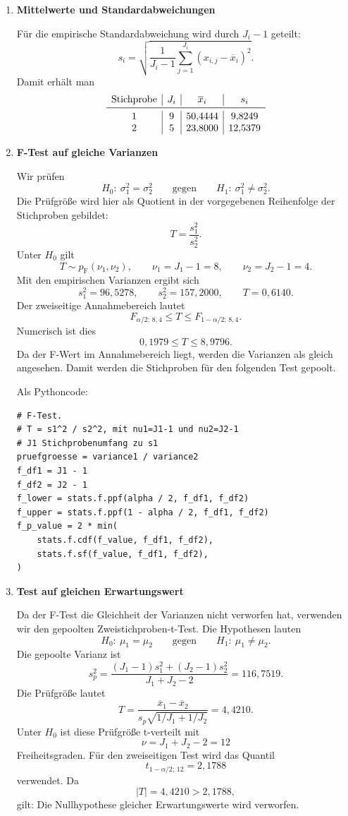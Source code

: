 \begin{enumerate}


\item[a)] \textbf{Mittelwerte und Standardabweichungen}

Für die empirische Standardabweichung wird durch $J_i-1$ geteilt:
\[
s_i=\sqrt{\frac{1}{J_i-1}\sum_{j=1}^{J_i}
(x_{i,j}-\overline{x}_i)^2}.
\]
Damit erhält man
\[
\begin{array}{c|c|c|c}
\text{Stichprobe} & J_i & \overline{x}_i & s_i\\
\midrule
1 & 9 & 50{,}4444 & 9{,}8249\\
2 & 5 & 23{,}8000 & 12{,}5379
\end{array}
\]

\item[b)] \textbf{F-Test auf gleiche Varianzen}

Wir prüfen
\[
H_0:\ \sigma_1^2=\sigma_2^2
\qquad\text{gegen}\qquad
H_1:\ \sigma_1^2\ne\sigma_2^2.
\]
Die Prüfgröße wird hier als Quotient in der vorgegebenen Reihenfolge
der Stichproben gebildet:
\[
T=\frac{s_1^2}{s_2^2}.
\]
Unter $H_0$ gilt
\[
T\sim p_\mathrm{F}({\nu_1,\nu_2}),
\qquad
\nu_1=J_1-1=8,
\qquad
\nu_2=J_2-1=4.
\]
Mit den empirischen Varianzen ergibt sich
\[
s_1^2=96{,}5278,
\qquad
s_2^2=157{,}2000,
\qquad
T=0{,}6140.
\]
Der zweiseitige Annahmebereich lautet
\[
F_{\alpha/2;\,8,4}
\leq T \leq
F_{1-\alpha/2;\,8,4}.
\]
Numerisch ist dies
\[
0{,}1979\leq T\leq8{,}9796.
\]
Da der F-Wert im Annahmebereich liegt, werden die Varianzen als gleich angesehen.
Damit werden die Stichproben für den folgenden Test gepoolt.

Als Pythoncode:

\begin{lstlisting}[style=Python]
# F-Test. 
# T = s1^2 / s2^2, mit nu1=J1-1 und nu2=J2-1
# J1 Stichprobenumfang zu s1
pruefgroesse = variance1 / variance2
f_df1 = J1 - 1
f_df2 = J2 - 1
f_lower = stats.f.ppf(alpha / 2, f_df1, f_df2)
f_upper = stats.f.ppf(1 - alpha / 2, f_df1, f_df2)
f_p_value = 2 * min(
    stats.f.cdf(f_value, f_df1, f_df2),
    stats.f.sf(f_value, f_df1, f_df2),
)
\end{lstlisting}

\item[c)] \textbf{Test auf gleichen Erwartungswert}

Da der F-Test die Gleichheit der Varianzen nicht verworfen hat,
verwenden wir den gepoolten Zweistichproben-t-Test. Die Hypothesen lauten
\[
H_0:\ \mu_1=\mu_2
\qquad\text{gegen}\qquad
H_1:\ \mu_1\ne\mu_2.
\]
Die gepoolte Varianz ist
\[
s_p^2=
\frac{(J_1-1)s_1^2+(J_2-1)s_2^2}{J_1+J_2-2}
=116{,}7519.
\]
Die Prüfgröße lautet
\[
T=\frac{\overline{x}_1-\overline{x}_2}
{s_p\sqrt{1/J_1+1/J_2}}
=4{,}4210.
\]
Unter $H_0$ ist diese Prüfgröße t-verteilt mit
\[
\nu=J_1+J_2-2=12
\]
Freiheitsgraden. Für den zweiseitigen Test wird das Quantil
\[
t_{1-\alpha/2;\,12}=2{,}1788
\]
verwendet. Da
\[
|T|=4{,}4210>2{,}1788,
\]
gilt:
Die Nullhypothese gleicher Erwartungswerte wird verworfen.


\end{enumerate}
